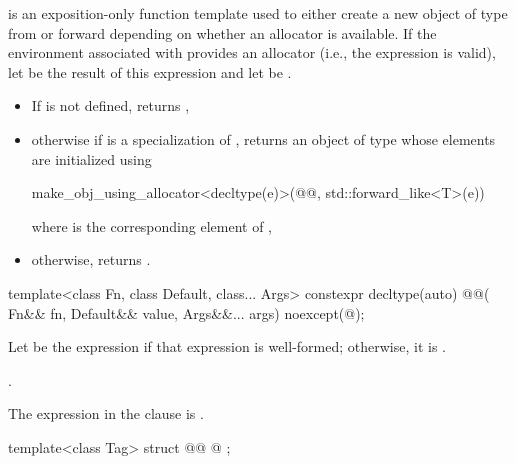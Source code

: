 \begin{itemdescr}
\pnum
{} is an exposition-only function template
used to either
create a new object of type  from 
or forward  depending on whether an allocator is available.
If the environment associated with  provides an allocator
(i.e., the expression  is valid),
let  be the result of this expression
and let  be .

\pnum
\returns
\begin{itemize}
\item
If  is not defined, returns ,
\item
otherwise if  is a specialization of ,
returns an object of type  whose elements are initialized using
\begin{codeblock}
make_obj_using_allocator<decltype(e)>(@@, std::forward_like<T>(e))
\end{codeblock}
where  is the corresponding element of ,
\item
otherwise, returns .
\end{itemize}
\end{itemdescr}

\begin{itemdecl}
template<class Fn, class Default, class... Args>
  constexpr decltype(auto) @@(
    Fn&& fn, Default&& value, Args&&... args) noexcept(@\seebelow@);
\end{itemdecl}

\begin{itemdescr}
\pnum
Let  be the expression
if that expression is well-formed;
otherwise, it is .

\pnum
\returns
{}.

\pnum
\remarks
The expression in the  clause is .
\end{itemdescr}

\pnum
{}%
\begin{codeblock}
template<class Tag>
struct @@ {
  @\seebelow@
};
\end{codeblock}

